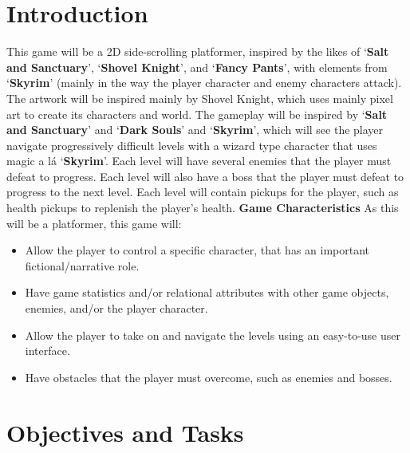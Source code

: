\documentclass[a4paper, 10pt]{article}
\begin{document}
\section{Introduction}
    This game will be a 2D side-scrolling platformer, inspired by the likes of ‘\textbf{Salt and Sanctuary}’, ‘\textbf{Shovel  Knight}’, and ‘\textbf{Fancy  Pants}’, with elements from ‘\textbf{Skyrim}’ (mainly in the way the player character and enemy characters attack).
    The artwork will be inspired mainly by Shovel Knight, which uses mainly pixel art to create its characters and world. \newline
    The gameplay will be inspired by ‘\textbf{Salt and Sanctuary}’ and ‘\textbf{Dark Souls}’ and ‘\textbf{Skyrim}’, which will see the player navigate  progressively  difficult  levels  with  a  wizard type  character  that  uses magic a lá ‘\textbf{Skyrim}’.\newline
    Each level will have several enemies that the player must defeat to progress. Each level will also have a boss that the player must defeat to progress to the next level. Each level will contain pickups for the player, such as health pickups to replenish the player’s health.\newline \newline 
    \textbf{Game Characteristics}
    \newline 
    As this will be a platformer, this game will: 
    \begin{itemize}
        \item Allow the player to control a specific character, that has an important fictional/narrative role.
        \item Have game statistics and/or relational attributes with other game objects, enemies, and/or the player character.
        \item Allow  the  player to take on and navigate the levels using  an easy-to-use  user interface.
        \item Have obstacles that the player must overcome, such as enemies and bosses.
    \end{itemize}

\section{Objectives and Tasks}
\end{document}
